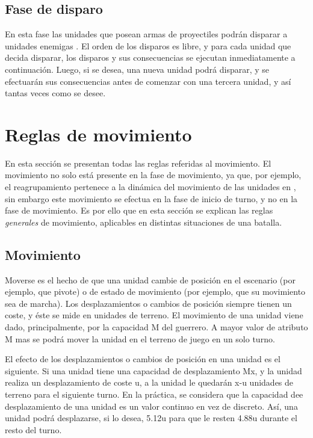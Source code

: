\subsection*{Fase de disparo}
\label{fasedisparo}
En esta fase las unidades que posean armas de proyectiles podrán
disparar a unidades enemigas . El orden de los disparos es libre, y
para cada unidad que decida disparar, los disparos y sus consecuencias
se ejecutan inmediatamente a continuación. Luego, si se desea, una
nueva unidad podrá disparar, y se efectuarán sus consecuencias antes
de comenzar con una tercera unidad, y así tantas veces como se desee.

\section*{Reglas de movimiento}
\label{movimiento}
En esta sección se presentan todas las reglas referidas al
movimiento. El movimiento no solo está presente en la fase de
movimiento, ya que, por ejemplo, el reagrupamiento pertenece a la
dinámica del movimiento de las unidades en \gomf, sin embargo
este movimiento se efectua en la fase de inicio de turno, y no en la
fase de movimiento. Es por ello que en esta sección se explican las
reglas \emph{generales} de movimiento, aplicables en distintas
situaciones de una batalla.

\subsection*{Movimiento}
Moverse es el hecho de que una unidad cambie de posición en el
escenario (por ejemplo, que pivote) o de estado de movimiento (por
ejemplo, que su movimiento sea de marcha). Los desplazamientos o
cambios de posición siempre tienen un coste, y éste se mide en
unidades de terreno. El movimiento de una unidad viene dado, principalmente, por la
capacidad M del guerrero. A mayor valor de atributo M mas se podrá
mover la unidad en el terreno de juego en un solo turno. 

El efecto de los desplazamientos o cambios de posición en una unidad
es el siguiente. Si una unidad tiene una capacidad de desplazamiento
Mx, y la unidad realiza un desplazamiento de coste u, a la unidad le
quedarán x-u unidades de terreno para el siguiente turno. En la
práctica, se considera que la capacidad dee desplazamiento de una
unidad es un valor continuo en vez de discreto. Así, una unidad podrá
desplazarse, si lo desea, 5.12u para que le resten 4.88u durante el
resto del turno.

